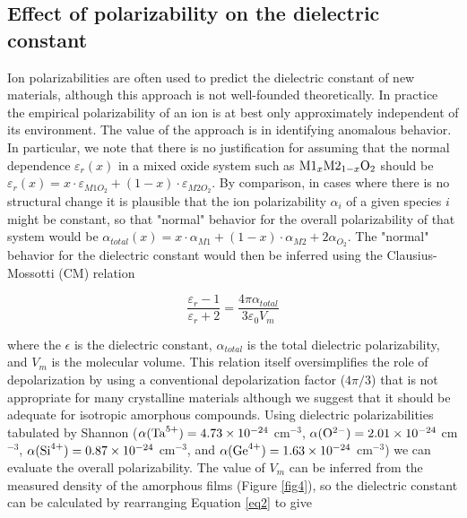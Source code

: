 \documentclass[aip,jap,numerical,citeautoscript,preprint]{revtex4-1}
\begin{document}
\subsection{Effect of polarizability on the dielectric constant}

Ion polarizabilities are often used to predict the dielectric constant of new materials, \cite{Roberts,Devine2001} although this approach is not well-founded theoretically. In practice the empirical polarizability of an ion is at best only approximately independent of its environment. The value of the approach is in identifying anomalous behavior. In particular, we note that there is no justification for assuming that the normal dependence $\varepsilon_{r} (x)$ in a mixed oxide system such as $\textnormal{M1}_{x}\textnormal{M2}_{1-x}\textnormal{O}_{2}$ should be $\varepsilon_{r} (x) = x \cdot \varepsilon _{M1O_{2}} + (1-x) \cdot \varepsilon _{M2O_{2}}$. By comparison, in cases where there is no structural change it is plausible that the ion polarizability $\alpha _{i}$ of a given species $i$ might be constant, so that "normal" behavior for the overall polarizability of that system would be $\alpha _{total}(x) = x \cdot \alpha _{M1} + (1-x) \cdot \alpha _{M2} + 2\alpha _{O_{2}}$. The "normal" behavior for the dielectric constant would then be inferred using the Clausius-Mossotti (CM) relation

\begin{equation}
\frac{\varepsilon_r-1}{\varepsilon_r+2} = \frac{4\pi\alpha _{total}}{3 \varepsilon_0 V_{m}}
\label{eq2}
\end{equation} 

where the $\epsilon$ is the dielectric constant, $\alpha _{total}$ is the total dielectric polarizability, and $V_{m}$ is the molecular volume. This relation itself oversimplifies the role of depolarization by using a conventional depolarization factor ($4\pi / 3$) that is not appropriate for many crystalline materials although we suggest that it should be adequate for isotropic amorphous compounds. Using dielectric polarizabilities tabulated by Shannon \cite {Shannon1993a} ($\alpha(\ce{Ta}^{5+}) = 4.73\times10^{-24}$ cm$^{-3}$, $\alpha(\ce{O}^{2-}) = 2.01\times10^{-24}$ cm$^{-3}$, $\alpha(\ce{Si}^{4+}) = 0.87\times10^{-24}$ cm$^{-3}$, and $\alpha(\ce{Ge}^{4+}) = 1.63\times10^{-24}$ cm$^{-3}$) we can evaluate the overall polarizability. The value of $V_{m}$ can be inferred from the measured density of the amorphous films (Figure \ref{fig4}), so the dielectric constant can be calculated by rearranging Equation \ref{eq2} to give
\end{document}
